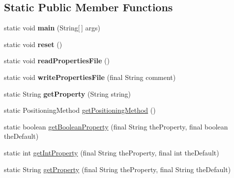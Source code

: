 \subsection*{Static Public Member Functions}
\begin{DoxyCompactItemize}
\item 
\hypertarget{classgov_1_1fnal_1_1ppd_1_1dd_1_1util_1_1PropertiesFile_a7be41c95da3f46ba50e479a5d3050a0b}{static void {\bfseries main} (String\mbox{[}$\,$\mbox{]} args)}\label{classgov_1_1fnal_1_1ppd_1_1dd_1_1util_1_1PropertiesFile_a7be41c95da3f46ba50e479a5d3050a0b}

\item 
\hypertarget{classgov_1_1fnal_1_1ppd_1_1dd_1_1util_1_1PropertiesFile_af1174d53278bd5bccced059a4f1ff94d}{static void {\bfseries reset} ()}\label{classgov_1_1fnal_1_1ppd_1_1dd_1_1util_1_1PropertiesFile_af1174d53278bd5bccced059a4f1ff94d}

\item 
\hypertarget{classgov_1_1fnal_1_1ppd_1_1dd_1_1util_1_1PropertiesFile_a7864ef2216034121b08c7066e4cebfdd}{static void {\bfseries read\-Properties\-File} ()}\label{classgov_1_1fnal_1_1ppd_1_1dd_1_1util_1_1PropertiesFile_a7864ef2216034121b08c7066e4cebfdd}

\item 
\hypertarget{classgov_1_1fnal_1_1ppd_1_1dd_1_1util_1_1PropertiesFile_a93bbfd7a45716bb5e7087e70dd52a858}{static void {\bfseries write\-Properties\-File} (final String comment)}\label{classgov_1_1fnal_1_1ppd_1_1dd_1_1util_1_1PropertiesFile_a93bbfd7a45716bb5e7087e70dd52a858}

\item 
\hypertarget{classgov_1_1fnal_1_1ppd_1_1dd_1_1util_1_1PropertiesFile_a72138f25e2d2cc91abfe8ce18b5d2eb3}{static String {\bfseries get\-Property} (String string)}\label{classgov_1_1fnal_1_1ppd_1_1dd_1_1util_1_1PropertiesFile_a72138f25e2d2cc91abfe8ce18b5d2eb3}

\item 
static Positioning\-Method \hyperlink{classgov_1_1fnal_1_1ppd_1_1dd_1_1util_1_1PropertiesFile_aa4951a242be44a8813a235c590445617}{get\-Positioning\-Method} ()
\item 
static boolean \hyperlink{classgov_1_1fnal_1_1ppd_1_1dd_1_1util_1_1PropertiesFile_a97468db291bec19c74a699b230aa8ba8}{get\-Boolean\-Property} (final String the\-Property, final boolean the\-Default)
\item 
static int \hyperlink{classgov_1_1fnal_1_1ppd_1_1dd_1_1util_1_1PropertiesFile_a7c94841a2b3e49c8c26bc8a45ce7e1f6}{get\-Int\-Property} (final String the\-Property, final int the\-Default)
\item 
static String \hyperlink{classgov_1_1fnal_1_1ppd_1_1dd_1_1util_1_1PropertiesFile_a8a8a0e08dc2ab3d3cb52ea2d3ed2222d}{get\-Property} (final String the\-Property, final String the\-Default)
\end{DoxyCompactItemize}


